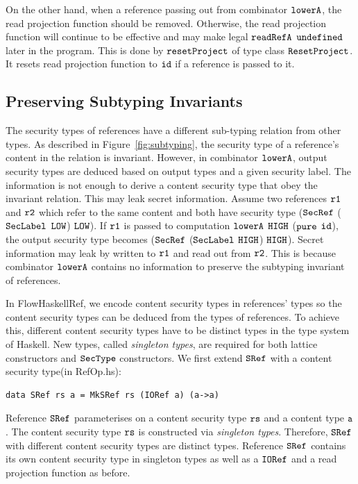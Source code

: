 \documentclass[a4paper]{report}
\newcommand{\co}[1]{$\cod{#1}$}
\begin{document}
On the other hand, when a reference passing out from combinator \co{lowerA}, the
read projection function should be removed. Otherwise, the read projection
function will continue to be effective and may make legal \co{readRefA} \co{undefined}
later in the program.
This is done by \co{resetProject} of type class \co{ResetProject}.
It resets read projection function to \co{id} if a reference is passed to it.


\subsection{Preserving Subtyping Invariants}
\label{chap4:singleton}


The security types of references have a different sub-typing relation from other types.
As described in Figure~\ref{fig:subtyping}, the security type of a reference's content in the relation 
is invariant. However, in combinator \co{lowerA}, output security types are deduced based on output types and a given
security label. The information is not enough to derive a content security type that obey the invariant
relation. This may leak secret information.
Assume two references \co{r1} and \co{r2} which refer to the same content and both have security type
(\co{SecRef} (\co{SecLabel} \co{LOW}) \co{LOW}). 
If \co{r1} is passed to computation \co{lowerA} \co{HIGH} (\co{pure} \co{id}), the output security type
becomes (\co{SecRef} (\co{SecLabel} \co{HIGH}) \co{HIGH}).
Secret information may leak by written to \co{r1} and read out from \co{r2}.
This is because combinator \co{lowerA} contains no information to preserve the subtyping invariant of references.

In FlowHaskellRef, we encode content security types in
references' types so the content security types can be deduced from the types of references.
To achieve this, different content security types have to be distinct types in the type system of Haskell.
New types, called {\em singleton types}, are required for both lattice constructors and \co{SecType} constructors.
We first extend \co{SRef} with a content security type(in RefOp.hs):
\begin{Verbatim}[fontsize=\footnotesize]
data SRef rs a = MkSRef rs (IORef a) (a->a)
\end{Verbatim}
Reference \co{SRef} parameterises on a content security type \co{rs} and a content type \co{a}.
The content security type \co{rs} is constructed via {\em singleton types}.
Therefore, \co{SRef} with different content security types are distinct types.
Reference \co{SRef} contains its own content security type in singleton types as well as 
a \co{IORef} and a read projection function as before.
\end{document}
